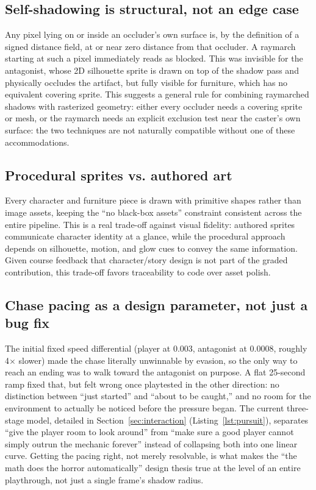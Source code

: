 \documentclass[conference]{IEEEtran}
\begin{document}
\subsection{Self-shadowing is structural, not an edge case}
Any pixel lying on or inside an occluder's own surface is, by the definition of a signed distance field, at or near zero distance from that occluder. A raymarch starting at such a pixel immediately reads as blocked. This was invisible for the antagonist, whose 2D silhouette sprite is drawn on top of the shadow pass and physically occludes the artifact, but fully visible for furniture, which has no equivalent covering sprite. This suggests a general rule for combining raymarched shadows with rasterized geometry: either every occluder needs a covering sprite or mesh, or the raymarch needs an explicit exclusion test near the caster's own surface: the two techniques are not naturally compatible without one of these accommodations.

\subsection{Procedural sprites vs. authored art}
Every character and furniture piece is drawn with primitive shapes rather than image assets, keeping the ``no black-box assets'' constraint consistent across the entire pipeline. This is a real trade-off against visual fidelity: authored sprites communicate character identity at a glance, while the procedural approach depends on silhouette, motion, and glow cues to convey the same information. Given course feedback that character/story design is not part of the graded contribution, this trade-off favors traceability to code over asset polish.

\subsection{Chase pacing as a design parameter, not just a bug fix}
The initial fixed speed differential (player at 0.003, antagonist at 0.0008, roughly 4$\times$ slower) made the chase literally unwinnable by evasion, so the only way to reach an ending was to walk toward the antagonist on purpose. A flat 25-second ramp fixed that, but felt wrong once playtested in the other direction: no distinction between ``just started'' and ``about to be caught,'' and no room for the environment to actually be noticed before the pressure began. The current three-stage model, detailed in Section~\ref{sec:interaction} (Listing~\ref{lst:pursuit}), separates ``give the player room to look around'' from ``make sure a good player cannot simply outrun the mechanic forever'' instead of collapsing both into one linear curve. Getting the pacing right, not merely resolvable, is what makes the ``the math does the horror automatically'' design thesis true at the level of an entire playthrough, not just a single frame's shadow radius.
\end{document}
